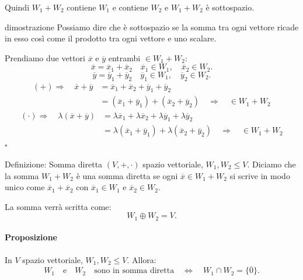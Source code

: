 \documentclass[x11names]{article}
\newcommand*{\QEDB}{\null\nobreak\hfill\ensuremath{\square}}%
\begin{document}
Quindi $W_1 + W_2$ contiene $W_1$ e contiene $W_2$ e $W_1 + W_2$ è sottospazio.
\begin{es}{dimostrazione}
Possiamo dire che è sottospazio se la somma tra ogni vettore ricade in esso così come il prodotto tra ogni vettore e uno scalare.

Prendiamo due vettori $\overline{x}$ e $\overline{y}$ entrambi $\in W_1 + W_2$:
\[
\overline{x} = \overline{x}_{1} + \overline{x}_{2} \quad \overline{x}_1 \in W_1, \quad \overline{x}_{2} \in W_2
.\] 
\[
\overline{y} = \overline{y}_{1} + \overline{y}_{2} \quad \overline{y}_1 \in W_1, \quad \overline{y}_{2} \in W_2
.\] 
\begin{align*}
	\left(+\right)\Rightarrow \quad \overline{x} + \overline{y} &= \overline{x}_{1} + \overline{x}_{2} + \overline{y}_{1} + \overline{y}_{2} \\
						      &= \left(\overline{x}_{1} + \overline{y}_{1}\right) + \left(\overline{x}_{2}+\overline{y}_{2}\right) \quad \Rightarrow \quad \in W_1 + W_2 
\end{align*}
\begin{align*}
	\left(\cdot\right) \Rightarrow \quad \lambda\left(\overline{x}+\overline{y}\right) &= \lambda \overline{x}_{1} + \lambda \overline{x}_{2} + \lambda \overline{y}_{1} + \lambda \overline{y}_{2} \\
						      &= \lambda\left(\overline{x}_{1} + \overline{y}_{1}\right) + \lambda\left(\overline{x}_{2}+\overline{y}_{2}\right) \quad \Rightarrow \quad \in W_1 + W_2
\end{align*}  \QEDB
\end{es}


\begin{center}
\colorbox{myblue}{\begin{minipage}{5.75in}
\begin{blues}{Definizione: Somma diretta}
$\left(V,+,\cdot\right)$ spazio vettoriale, $W_1,W_2 \leq V$. Diciamo che la somma $W_1+W_2$ è una somma diretta se ogni $\overline{x} \in W_1+W_2$ si scrive in modo unico come $\overline{x}_1 + \overline{x}_2$ con $\overline{x}_1 \in W_1$ e $\overline{x}_2 \in W_2 $.

La somma verrà scritta come:
\[
W_1 \oplus W_2 = V
.\] 
\end{blues}
\end{minipage}}        
\end{center}

\paragraph{Proposizione}
In $V$ spazio vettoriale, $W_1,W_2 \leq V$. Allora:
\[
W_1 \quad \text{e} \quad W_2 \quad \text{sono in somma diretta} \quad \Longleftrightarrow \quad W_1 \cap W_2 = \{\overline{0}\} 
.\] 
\end{document}
